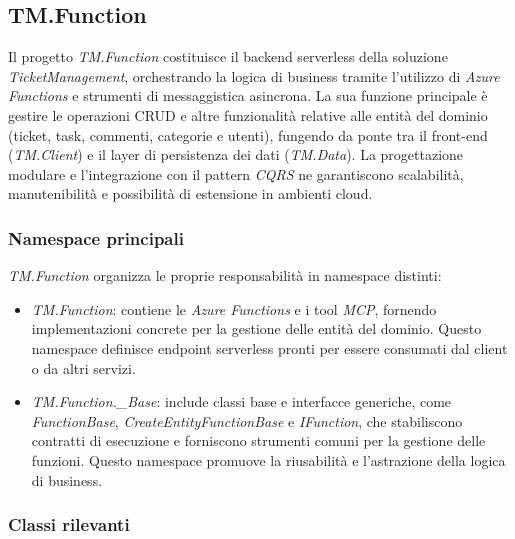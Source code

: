 \subsection{TM.Function}

Il progetto \textit{TM.Function} costituisce il backend serverless della soluzione \textit{TicketManagement}, orchestrando la logica di business tramite l'utilizzo di \textit{Azure Functions} e strumenti di messaggistica asincrona. La sua funzione principale è gestire le operazioni CRUD e altre funzionalità relative alle entità del dominio (ticket, task, commenti, categorie e utenti), fungendo da ponte tra il front-end (\textit{TM.Client}) e il layer di persistenza dei dati (\textit{TM.Data}). La progettazione modulare e l'integrazione con il pattern \textit{CQRS} ne garantiscono scalabilità, manutenibilità e possibilità di estensione in ambienti cloud.

\subsubsection{Namespace principali}

\textit{TM.Function} organizza le proprie responsabilità in namespace distinti:
\begin{itemize}
\item \textit{TM.Function}: contiene le \textit{Azure Functions} e i tool \textit{MCP}, fornendo implementazioni concrete per la gestione delle entità del dominio. Questo namespace definisce endpoint serverless pronti per essere consumati dal client o da altri servizi.

\item \textit{TM.Function.\_Base}: include classi base e interfacce generiche, come \textit{FunctionBase}, \textit{CreateEntityFunctionBase} e \textit{IFunction}, che stabiliscono contratti di esecuzione e forniscono strumenti comuni per la gestione delle funzioni. Questo namespace promuove la riusabilità e l'astrazione della logica di business.
\end{itemize}

\subsubsection{Classi rilevanti}

